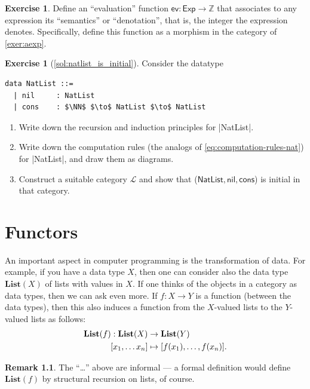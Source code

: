 \documentclass[a4paper,11pt, oneside,titlepage=false]{scrbook}
\theoremstyle{plain}
\theoremstyle{definition}
\newtheorem{rem}[thm]{Remark}
\newtheorem{exer}[thm]{Exercise}
\newcommand{\Cat}[1]{\mathcal{#1}}
\newcommand{\Catb}[1]{\mathbf{#1}}
\newcommand{\List}{\Catb{List}}
\newcommand{\nil}{\ensuremath{\mathsf{nil}}}
\newcommand{\cons}{\ensuremath{\mathsf{cons}}}
\newcommand{\NN}{\ensuremath{\mathbb{N}}}
\begin{document}
\begin{exer}
  Define an ``evaluation'' function $\mathsf{ev} : \mathsf{Exp} \to \mathbb{Z}$ that associates to any expression its ``semantics'' or ``denotation'', that is, the integer the expression denotes.
  Specifically, define this function as a morphism in the category of \cref{exer:aexp}.
\end{exer}

\begin{exer}[\cref{sol:natlist_is_initial}]\label{exer:natlist_is_initial}
  Consider the datatype
\begin{lstlisting}[mathescape=true]
  data NatList ::=
  | nil     : NatList
  | cons    : $\NN$ $\to$ NatList $\to$ NatList
\end{lstlisting}

  \begin{enumerate}
  \item Write down the recursion and induction principles for |NatList|.
  \item  Write down the computation rules (the analogs of \cref{eq:computation-rules-nat}) for |NatList|, and draw them as diagrams.
  \item Construct a suitable category $\Cat{L}$ and show that ($\mathsf{NatList}, \nil, \cons$) is initial in that category.
  \end{enumerate}

\end{exer}

\chapter{Functors}\label{sec:functors}
An important aspect in computer programming is the transformation of data. For example, if you have a data type $X$, then one can consider also the data type $\List(X)$ of lists with values in $X$. If one thinks of the objects in a category as data types, then we can ask even more. If $f:X\to Y$ is a function (between the data types), then this also induces a function from the $X$-valued lists to the $Y$-valued lists as follows:
\begin{align}\label{eqn:function_on_list}
  \List(f) : \List(X)&\to \List(Y)
  \\
  [x_1,\ldots x_n] &\mapsto [f(x_1),\ldots,f(x_n)]. \notag
\end{align}

\begin{rem}
  The ``\ldots'' above are informal --- a formal definition would define $\List(f)$ by structural recursion on lists, of course.
\end{rem}
\end{document}
